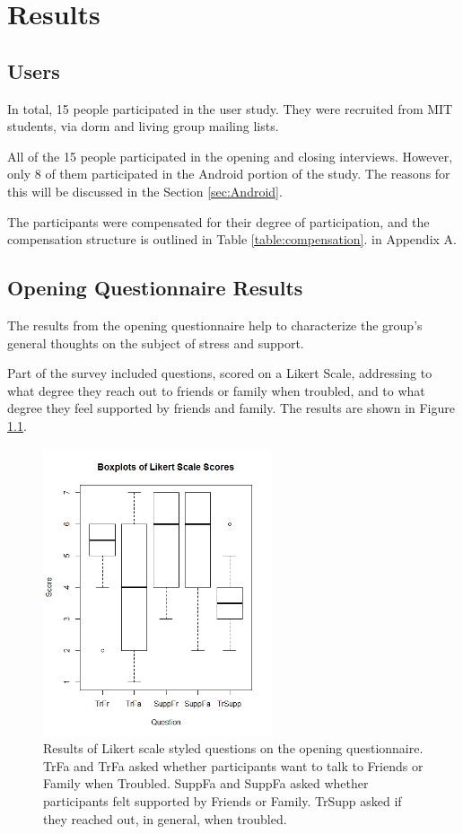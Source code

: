 \chapter{Results}
\section{Users}
  In total, 15 people participated in the user study.
  They were recruited from MIT students,
  via dorm and living group mailing lists.

  All of the 15 people participated in the opening and closing interviews.
  However, only 8 of them participated in the Android portion of the study.
  The reasons for this will be discussed in the Section \ref{sec:Android}.

  The participants were compensated for their degree of participation,
  and the compensation structure is outlined in Table \ref{table:compensation}.
  in Appendix A.

\section{Opening Questionnaire Results}
  The results from the opening questionnaire help to characterize the group's
  general thoughts on the subject of stress and support.
  
  Part of the survey included questions, scored on a Likert Scale,
  addressing to what degree they reach out to friends or family when troubled,
  and to what degree they feel supported by friends and family.
  The results are shown in Figure \ref{fig:likert}.

    \begin{figure}
    \centering
    \includegraphics[width=0.6\textwidth]{likert.png}
    \caption[Likert Scale Box Plots]{
      Results of Likert scale styled questions on the opening questionnaire.
      TrFa and TrFa asked whether participants want to talk to
      Friends or Family when Troubled.
      SuppFa and SuppFa asked whether participants felt supported by
      Friends or Family.
      TrSupp asked if they reached out, in general, when troubled.
    }
    \label{fig:likert}
    \end{figure}

